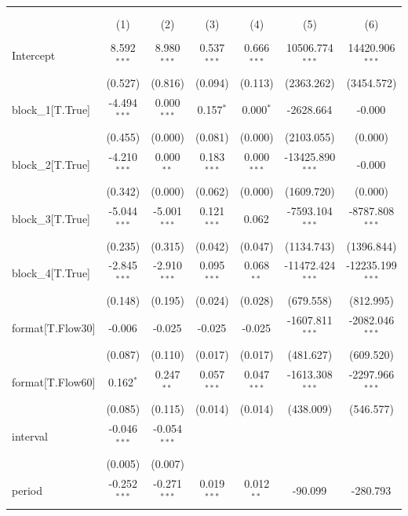 \begin{table}[!htbp] \centering
\begin{tabular}{@{\extracolsep{5pt}}lcccccc}
\\[-1.8ex]\hline
\hline \\[-1.8ex]
\\[-1.8ex] & (1) & (2) & (3) & (4) & (5) & (6) \\
\hline \\[-1.8ex]
 Intercept & 8.592$^{***}$ & 8.980$^{***}$ & 0.537$^{***}$ & 0.666$^{***}$ & 10506.774$^{***}$ & 14420.906$^{***}$ \\
& (0.527) & (0.816) & (0.094) & (0.113) & (2363.262) & (3454.572) \\
 block_1[T.True] & -4.494$^{***}$ & 0.000$^{***}$ & 0.157$^{*}$ & 0.000$^{*}$ & -2628.664$^{}$ & -0.000$^{}$ \\
& (0.455) & (0.000) & (0.081) & (0.000) & (2103.055) & (0.000) \\
 block_2[T.True] & -4.210$^{***}$ & 0.000$^{**}$ & 0.183$^{***}$ & 0.000$^{***}$ & -13425.890$^{***}$ & -0.000$^{}$ \\
& (0.342) & (0.000) & (0.062) & (0.000) & (1609.720) & (0.000) \\
 block_3[T.True] & -5.044$^{***}$ & -5.001$^{***}$ & 0.121$^{***}$ & 0.062$^{}$ & -7593.104$^{***}$ & -8787.808$^{***}$ \\
& (0.235) & (0.315) & (0.042) & (0.047) & (1134.743) & (1396.844) \\
 block_4[T.True] & -2.845$^{***}$ & -2.910$^{***}$ & 0.095$^{***}$ & 0.068$^{**}$ & -11472.424$^{***}$ & -12235.199$^{***}$ \\
& (0.148) & (0.195) & (0.024) & (0.028) & (679.558) & (812.995) \\
 format[T.Flow30] & -0.006$^{}$ & -0.025$^{}$ & -0.025$^{}$ & -0.025$^{}$ & -1607.811$^{***}$ & -2082.046$^{***}$ \\
& (0.087) & (0.110) & (0.017) & (0.017) & (481.627) & (609.520) \\
 format[T.Flow60] & 0.162$^{*}$ & 0.247$^{**}$ & 0.057$^{***}$ & 0.047$^{***}$ & -1613.308$^{***}$ & -2297.966$^{***}$ \\
& (0.085) & (0.115) & (0.014) & (0.014) & (438.009) & (546.577) \\
 interval & -0.046$^{***}$ & -0.054$^{***}$ & & & & \\
& (0.005) & (0.007) & & & & \\
 period & -0.252$^{***}$ & -0.271$^{***}$ & 0.019$^{***}$ & 0.012$^{**}$ & -90.099$^{}$ & -280.793$^{}$ \\

\end{tabular}
\end{table}
